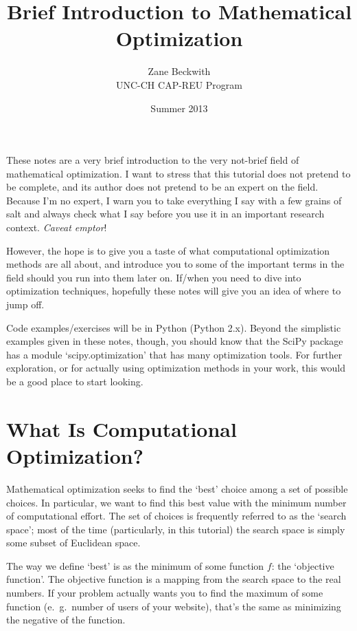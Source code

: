 \documentclass{article}
\begin{document}
\title{Brief Introduction to Mathematical Optimization}
\author{Zane Beckwith \\
UNC-CH CAP-REU Program}
\date{Summer 2013}
\maketitle

These notes are a very brief introduction to the very not-brief field of 
mathematical optimization. I want to stress that this tutorial does not
pretend to be complete, and its author does not pretend to be an expert
on the field. Because I'm no expert, I warn you to take everything I say
with a few grains of salt and always check what I say before you use
it in an important research context. \textit{Caveat emptor}!

However, the hope is to give you a taste of what computational
optimization methods are all about, and introduce you to some of the important
terms in the field should you run into them later on. If/when you need to dive
into optimization techniques, hopefully these notes will give you an idea of 
where to jump off.

Code examples/exercises will be in Python (Python 2.x). Beyond the simplistic
examples given in these notes, though, you should know that the SciPy package
has a module `scipy.optimization' that has many optimization tools. For further
exploration, or for actually using optimization methods in your work, 
this would be a good place to start looking.

\section*{What Is Computational Optimization?}
	Mathematical optimization seeks to find the `best' choice among
	a set of possible choices. In particular, we want to find this best
	value with the minimum number of computational effort. 
	The set of choices is frequently referred
	to as the `search space'; most of the time (particularly, in this tutorial)
	the search space is simply some subset of Euclidean space.

	The way we define `best' is as the minimum of some function $f$:
	the `objective function'. The objective function is a mapping
	from the search space to the real numbers. If your problem actually
	wants you to find the maximum of some function (e.\ g.\ number of users
	of your website), that's the same as minimizing the negative of the function.
\end{document}
